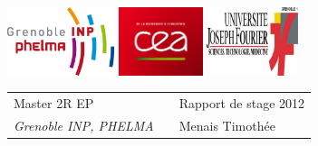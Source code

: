 \documentclass[a4paper,11pt]{article}
\begin{document}

\setlength{\parindent}{0pt}

\thispagestyle{empty}

\includegraphics[height=2cm]{phelma.jpg} \hfill \includegraphics[height=2cm]{cea2.png} \hfill \includegraphics[height=2cm]{ujf.jpg}

\vspace{0.5cm}

\begin{tabularx}{\textwidth}{@{} l X l @{} }
{\sc Master  2R EP} & & Rapport de stage 2012 \\
{\it Grenoble INP, PHELMA} & & Menais Timothée \\

\end{tabularx}
\end{document}
